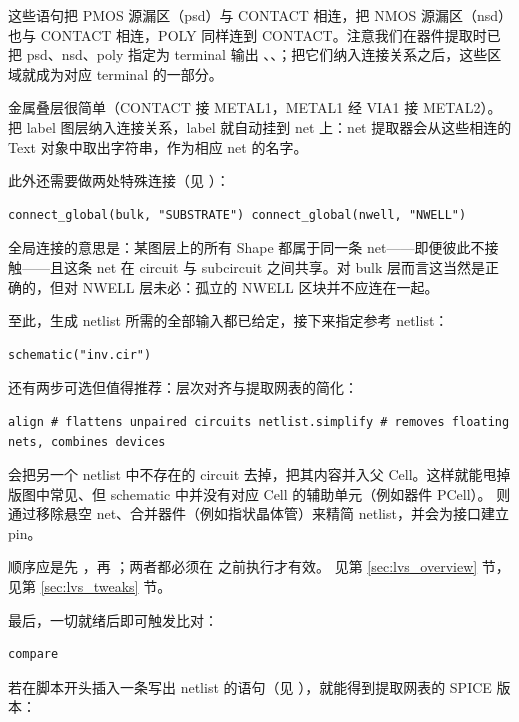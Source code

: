 这些语句把 PMOS 源漏区（psd）与 CONTACT 相连，把 NMOS 源漏区（nsd）也与 CONTACT 相连，POLY 同样连到 CONTACT。注意我们在器件提取时已把 psd、nsd、poly 指定为 terminal 输出 、、；把它们纳入连接关系之后，这些区域就成为对应 terminal 的一部分。

金属叠层很简单（CONTACT 接 METAL1，METAL1 经 VIA1 接 METAL2）。把 label 图层纳入连接关系，label 就自动挂到 net 上：net 提取器会从这些相连的 Text 对象中取出字符串，作为相应 net 的名字。

此外还需要做两处特殊连接（见 ）：

\begin{lstlisting}
connect_global(bulk, "SUBSTRATE") connect_global(nwell, "NWELL")
\end{lstlisting}

全局连接的意思是：某图层上的所有 Shape 都属于同一条 net——即便彼此不接触——且这条 net 在 circuit 与 subcircuit 之间共享。对 bulk 层而言这当然是正确的，但对 NWELL 层未必：孤立的 NWELL 区块并不应连在一起。

至此，生成 netlist 所需的全部输入都已给定，接下来指定参考 netlist：

\begin{lstlisting}
schematic("inv.cir")
\end{lstlisting}

还有两步可选但值得推荐：层次对齐与提取网表的简化：

\begin{lstlisting}
align # flattens unpaired circuits netlist.simplify # removes floating nets, combines devices
\end{lstlisting}

 会把另一个 netlist 中不存在的 circuit 去掉，把其内容并入父 Cell。这样就能甩掉版图中常见、但 schematic 中并没有对应 Cell 的辅助单元（例如器件 PCell）。 则通过移除悬空 net、合并器件（例如指状晶体管）来精简 netlist，并会为接口建立 pin。

顺序应是先 ，再 ；两者都必须在  之前执行才有效。 见第 \ref{sec:lvs_overview} 节， 见第 \ref{sec:lvs_tweaks} 节。

最后，一切就绪后即可触发比对：

\begin{lstlisting}
compare
\end{lstlisting}

若在脚本开头插入一条写出 netlist 的语句（见 ），就能得到提取网表的 SPICE 版本：

